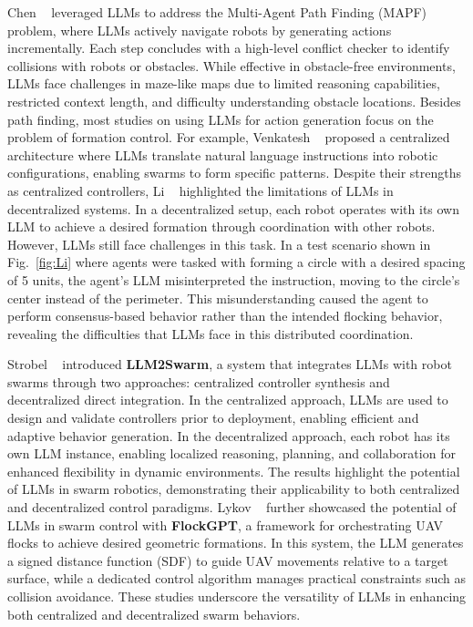 Chen \etal~\cite{chen_why_2024} leveraged LLMs to address the Multi-Agent Path Finding (MAPF) problem, where LLMs actively navigate robots by generating actions incrementally. Each step concludes with a high-level conflict checker to identify collisions with robots or obstacles. While effective in obstacle-free environments, LLMs face challenges in maze-like maps due to limited reasoning capabilities, restricted context length, and difficulty understanding obstacle locations. Besides path finding, most studies on using LLMs for action generation focus on the problem of formation control. For example, Venkatesh \etal~\cite{venkatesh_zerocap_2024} proposed a centralized architecture where LLMs translate natural language instructions into robotic configurations, enabling swarms to form specific patterns. Despite their strengths as centralized controllers, Li \etal~\cite{li_challenges_2024} highlighted the limitations of LLMs in decentralized systems. In a decentralized setup, each robot operates with its own LLM to achieve a desired formation through coordination with other robots. However, LLMs still face challenges in this task. In a test scenario shown in Fig.~\ref{fig:Li} where agents were tasked with forming a circle with a desired spacing of 5 units, the agent's LLM misinterpreted the instruction, moving to the circle's center instead of the perimeter. This misunderstanding caused the agent to perform consensus-based behavior rather than the intended flocking behavior, revealing the difficulties that LLMs face in this distributed coordination.

Strobel \etal~\cite{strobel_llm2swarm_2024} introduced \textbf{LLM2Swarm}, a system that integrates LLMs with robot swarms through two approaches: centralized controller synthesis and decentralized direct integration. In the centralized approach, LLMs are used to design and validate controllers prior to deployment, enabling efficient and adaptive behavior generation. In the decentralized approach, each robot has its own LLM instance, enabling localized reasoning, planning, and collaboration for enhanced flexibility in dynamic environments. The results highlight the potential of LLMs in swarm robotics, demonstrating their applicability to both centralized and decentralized control paradigms. Lykov \etal~\cite{lykov2024flockgpt} further showcased the potential of LLMs in swarm control with \textbf{FlockGPT}, a framework for orchestrating UAV flocks to achieve desired geometric formations. In this system, the LLM generates a signed distance function (SDF) to guide UAV movements relative to a target surface, while a dedicated control algorithm manages practical constraints such as collision avoidance. These studies underscore the versatility of LLMs in enhancing both centralized and decentralized swarm behaviors.



